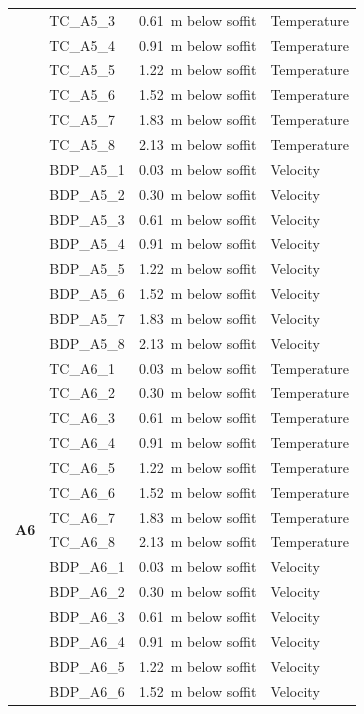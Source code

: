 \documentclass[12pt,oneside]{book}
\begin{document}
\begin{longtable}[c]{c|lll}
 & TC\_A5\_3  & 0.61~m below soffit  & Temperature \\
 & TC\_A5\_4  & 0.91~m below soffit  & Temperature \\
 & TC\_A5\_5  & 1.22~m below soffit  & Temperature \\
 & TC\_A5\_6  & 1.52~m below soffit  & Temperature \\
 & TC\_A5\_7  & 1.83~m below soffit  & Temperature \\
 & TC\_A5\_8  & 2.13~m below soffit  & Temperature \\
\cline{2-4}
 & BDP\_A5\_1 & 0.03~m below soffit  & Velocity \\
 & BDP\_A5\_2 & 0.30~m below soffit  & Velocity \\
 & BDP\_A5\_3 & 0.61~m below soffit  & Velocity \\
 & BDP\_A5\_4 & 0.91~m below soffit  & Velocity \\
 & BDP\_A5\_5 & 1.22~m below soffit  & Velocity \\
 & BDP\_A5\_6 & 1.52~m below soffit  & Velocity \\
 & BDP\_A5\_7 & 1.83~m below soffit  & Velocity \\
 & BDP\_A5\_8 & 2.13~m below soffit  & Velocity \\
\midrule
\multirow{16}{*}{\large{\textbf{A6}}}
 & TC\_A6\_1  & 0.03~m below soffit  & Temperature \\
 & TC\_A6\_2  & 0.30~m below soffit  & Temperature \\
 & TC\_A6\_3  & 0.61~m below soffit  & Temperature \\
 & TC\_A6\_4  & 0.91~m below soffit  & Temperature \\
 & TC\_A6\_5  & 1.22~m below soffit  & Temperature \\
 & TC\_A6\_6  & 1.52~m below soffit  & Temperature \\
 & TC\_A6\_7  & 1.83~m below soffit  & Temperature \\
 & TC\_A6\_8  & 2.13~m below soffit  & Temperature \\
\cline{2-4}
 & BDP\_A6\_1 & 0.03~m below soffit  & Velocity \\
 & BDP\_A6\_2 & 0.30~m below soffit  & Velocity \\
 & BDP\_A6\_3 & 0.61~m below soffit  & Velocity \\
 & BDP\_A6\_4 & 0.91~m below soffit  & Velocity \\
 & BDP\_A6\_5 & 1.22~m below soffit  & Velocity \\
 & BDP\_A6\_6 & 1.52~m below soffit  & Velocity \\

\end{longtable}
\end{document}
